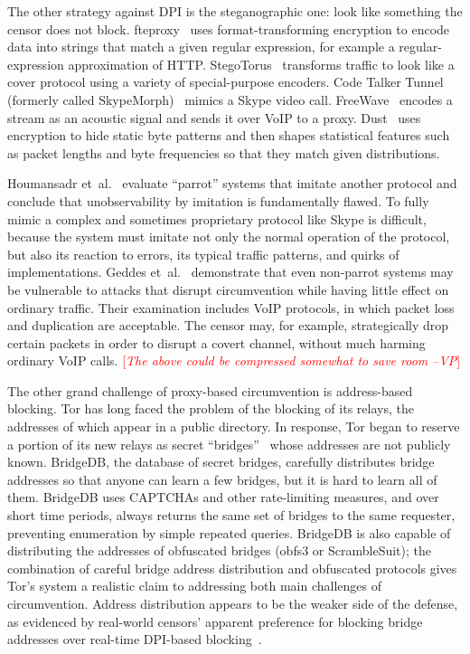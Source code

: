 \documentclass{sig-alternate}
\newcommand{\note}[1]{{\textcolor{red}{[\textit{#1}]}}}
\newcommand{\vp}[1]{\note{#1 --VP}}
\begin{document}
The other strategy against DPI is the steganographic one: look like
something the censor does not block.
fteproxy~\cite{fte} uses format-transforming encryption to encode data into strings
that match a given regular expression,
for example a regular-expression approximation of HTTP.
StegoTorus~\cite{stegotorus}
transforms traffic to look like a cover protocol
using a variety of special-purpose encoders.
Code Talker
Tunnel (formerly called SkypeMorph)~\cite{skypemorph} mimics a Skype video call.
FreeWave~\cite{freewave} encodes a stream as an acoustic signal
and sends it over VoIP to a proxy.
Dust~\cite{dust} uses encryption to hide static byte patterns and then
shapes statistical features such as packet lengths and byte frequencies so that they
match given distributions.

Houmansadr et~al.~\cite{parrot} evaluate ``parrot'' systems that imitate another protocol
and conclude that unobservability by imitation is fundamentally flawed.
To fully mimic a complex and sometimes proprietary protocol like Skype
is difficult,
because the system must imitate not only the normal operation of the protocol,
but also its reaction to errors,
its typical traffic patterns, and quirks of implementations.
Geddes et~al.~\cite{acks}
demonstrate that even non-parrot systems may be vulnerable to
attacks that disrupt circumvention while having little effect
on ordinary traffic.
Their examination includes VoIP protocols,
in which packet loss and duplication are acceptable.
The censor may, for example, strategically drop certain packets
in order to disrupt a covert channel, without much harming ordinary VoIP calls.
\vp{The above could be compressed somewhat to save room}


The other grand challenge of proxy-based circumvention is address-based blocking.
Tor has long faced the problem of the blocking of its relays,
the addresses of which appear in a public directory.
In response, Tor began to reserve a portion of its
new relays as secret ``bridges''~\cite{tor-blocking}
whose addresses are not publicly known.
BridgeDB, the database of secret bridges,
carefully distributes bridge addresses
so that anyone can learn a few bridges, but it is hard to learn all of them.
BridgeDB uses CAPTCHAs and other rate-limiting measures,
and over short time periods,
always returns the same set of bridges to the same requester,
preventing enumeration by simple repeated queries.
BridgeDB is also capable of distributing the addresses
of obfuscated bridges (obfs3 or ScrambleSuit);
the combination
of careful bridge address distribution and obfuscated protocols
gives Tor's system a realistic claim to addressing both main challenges of circumvention.
Address distribution appears to be the weaker side of the defense,
as evidenced by real-world censors' apparent preference for
blocking bridge addresses over real-time DPI-based blocking~\cite{foci12-winter}.
\end{document}
